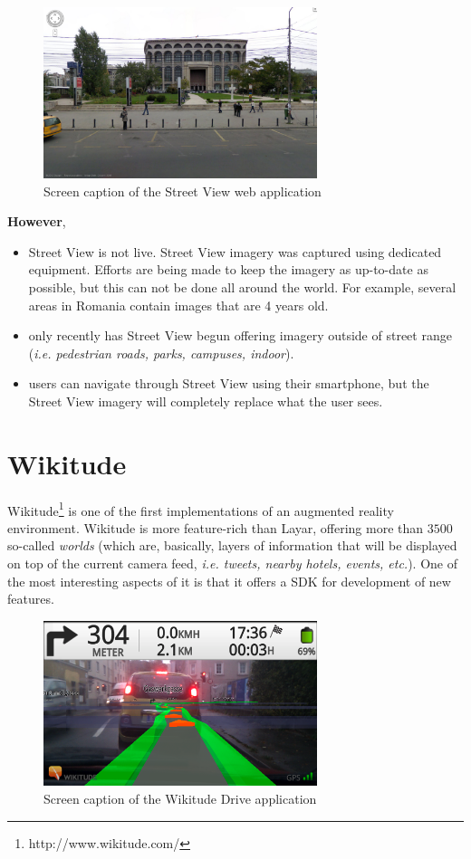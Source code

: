 \documentclass[a4paper,onecolumn,oneside,titlepage,11pt]{report}
\begin{document}
\begin{figure}[H]
\begin{center}
\includegraphics[width=8cm]{images/tnb_streetview.png}
\caption{Screen caption of the Street View web application}
\end{center}
\end{figure}

\textbf{However},
\begin{itemize}
	\item Street View is not live. Street View imagery was captured using dedicated equipment. Efforts are being made to keep the imagery as up-to-date as possible, but this can not be done all around the world. For example, several areas in Romania contain images that are 4 years old.
	\item only recently has Street View begun offering imagery outside of street range (\emph{i.e. pedestrian roads, parks, campuses, indoor}).
	\item users can navigate through Street View using their smartphone, but the Street View imagery will completely replace what the user sees.
\end{itemize}
\section{Wikitude}

Wikitude\footnote{http://www.wikitude.com/} is one of the first implementations of an augmented reality environment. Wikitude is more feature-rich than Layar, offering more than $3500$ so-called \emph{worlds} (which are, basically, layers of information that will be displayed on top of the current camera feed, \emph{i.e. tweets, nearby hotels, events, etc.}). One of the most interesting aspects of it is that it offers a SDK for development of new features.

\begin{figure}[H]
\begin{center}
\includegraphics[width=8cm]{images/wikitude_drive.png}
\caption{Screen caption of the Wikitude Drive application}
\end{center}
\end{figure}
\end{document}
